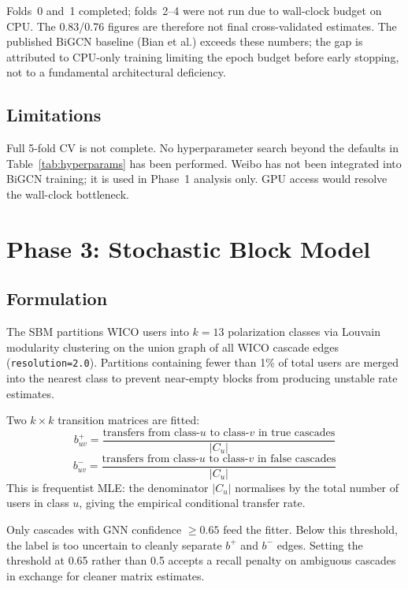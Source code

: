 \documentclass[conference]{IEEEtran}
\begin{document}
Folds~0 and~1 completed; folds~2--4 were not run due to wall-clock budget on
CPU.
The 0.83/0.76 figures are therefore not final cross-validated estimates.
The published BiGCN baseline (Bian et al.) exceeds these numbers; the gap is
attributed to CPU-only training limiting the epoch budget before early stopping,
not to a fundamental architectural deficiency.

\subsection{Limitations}

Full 5-fold CV is not complete.
No hyperparameter search beyond the defaults in Table~\ref{tab:hyperparams}
has been performed.
Weibo has not been integrated into BiGCN training; it is used in Phase~1
analysis only.
GPU access would resolve the wall-clock bottleneck.

\section{Phase 3: Stochastic Block Model}

\subsection{Formulation}

The SBM partitions WICO users into \(k=13\) polarization classes via Louvain
modularity clustering on the union graph of all WICO cascade edges
(\texttt{resolution=2.0}).
Partitions containing fewer than 1\% of total users are merged into the nearest
class to prevent near-empty blocks from producing unstable rate estimates.

Two \(k \times k\) transition matrices are fitted:
\[
  b^+_{uv} = \frac{\text{transfers from class-}u\text{ to class-}v
                   \text{ in true cascades}}{|C_u|}
\]
\[
  b^-_{uv} = \frac{\text{transfers from class-}u\text{ to class-}v
                   \text{ in false cascades}}{|C_u|}
\]
This is frequentist MLE: the denominator \(|C_u|\) normalises by the total
number of users in class \(u\), giving the empirical conditional transfer rate.

Only cascades with GNN confidence \(\geq 0.65\) feed the fitter.
Below this threshold, the label is too uncertain to cleanly separate
\(b^+\) and \(b^-\) edges.
Setting the threshold at 0.65 rather than 0.5 accepts a recall penalty on
ambiguous cascades in exchange for cleaner matrix estimates.
\end{document}
